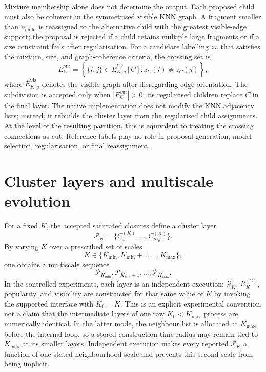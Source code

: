 \documentclass[pdflatex,sn-mathphys-num]{sn-jnl}
\newcommand{\calG}{\mathcal{G}}
\newcommand{\calP}{\mathcal{P}}
\begin{document}
Mixture membership alone does not determine the output.  Each proposed child
must also be coherent in the symmetrised visible KNN graph.  A fragment smaller
than $n_{\mathrm{child}}$ is reassigned to the alternative child with the
greatest visible-edge support; the proposal is rejected if a child retains
multiple large fragments or if a size constraint fails after regularisation.
For a candidate labelling $z_C$ that satisfies the mixture, size, and
graph-coherence criteria, the crossing set is
\begin{equation}
E_C^{\mathrm{cut}}=
\left\{\{i,j\}\in\overline E_{K,g}^{\mathrm{vis}}[C]:
z_C(i)\neq z_C(j)\right\},
\label{eq:pruning_cut}
\end{equation}
where $\overline E_{K,g}^{\mathrm{vis}}$ denotes the visible graph after
disregarding edge orientation.  The subdivision is accepted only when
$|E_C^{\mathrm{cut}}|>0$; its regularised children replace $C$ in the final
layer.  The native implementation does not modify the KNN adjacency lists;
instead, it rebuilds the cluster layer from the regularised child assignments.
At the level of the resulting partition, this is equivalent to treating the
crossing connections as cut.  Reference labels play no role in proposal
generation, model selection, regularisation, or final reassignment.

\section{Cluster layers and multiscale evolution}\label{sec:layers}

For a fixed $K$, the accepted saturated closures define a cluster layer
\begin{equation}
\calP_K=\{C_1^{(K)},\ldots,C_{m_K}^{(K)}\}.
\end{equation}
By varying $K$ over a prescribed set of scales
\begin{equation}
K\in\{K_{\min},K_{\min}+1,\ldots,K_{\max}\},
\end{equation}
one obtains a multiscale sequence
\begin{equation}
\calP_{K_{\min}},\calP_{K_{\min}+1},\ldots,\calP_{K_{\max}}.
\end{equation}
In the controlled experiments, each layer is an independent execution:
$\calG_K$, $R_K^{(2)}$, popularity, and visibility are constructed for that
same value of $K$ by invoking the supported interface with $K_0=K$.  This is an
explicit experimental convention, not a claim that the intermediate layers of
one raw $K_0\!<\!K_{\max}$ process are numerically identical.  In the latter
mode, the neighbour list is allocated at $K_{\max}$ before the internal loop,
so a stored construction-time radius may remain tied to $K_{\max}$ at its
smaller layers.  Independent execution makes every reported $\calP_K$ a
function of one stated neighbourhood scale and prevents this second scale from
being implicit.
\end{document}
